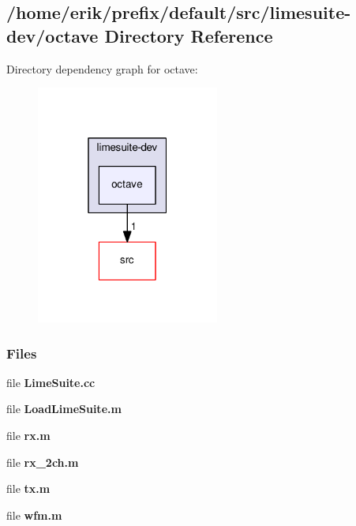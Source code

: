 \subsection{/home/erik/prefix/default/src/limesuite-\/dev/octave Directory Reference}
\label{dir_b6d8780e8f227703c1930747b95fd134}
Directory dependency graph for octave\+:
\nopagebreak
\begin{figure}[H]
\begin{center}
\leavevmode
\includegraphics[width=170pt]{dir_b6d8780e8f227703c1930747b95fd134_dep}
\end{center}
\end{figure}
\subsubsection*{Files}
\begin{DoxyCompactItemize}
\item 
file {\bf Lime\+Suite.\+cc}
\item 
file {\bf Load\+Lime\+Suite.\+m}
\item 
file {\bf rx.\+m}
\item 
file {\bf rx\+\_\+2ch.\+m}
\item 
file {\bf tx.\+m}
\item 
file {\bf wfm.\+m}
\end{DoxyCompactItemize}
